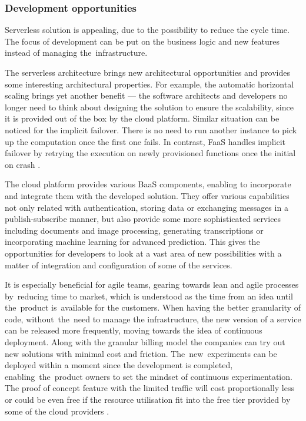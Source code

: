 \subsubsection{Development opportunities} \label{chapter:serverless-development-opportunities}

Serverless solution is appealing, due to the possibility to reduce the cycle time. The focus of development can be put on the business logic and new features instead of managing the~infrastructure.

The serverless architecture brings new architectural opportunities and provides some interesting architectural properties. For example, the automatic horizontal scaling brings yet another benefit --- the software architects and developers no longer need to think about designing the solution to ensure the scalability, since it is provided out of the box by the cloud platform. Similar situation can be noticed for the implicit failover. There is no need to run another instance to pick up the computation once the first one fails. In contrast, FaaS handles implicit failover by retrying the execution on newly provisioned functions once the initial on crash \cite{LeveragingServerlessCloudComputingArchitectures}.

The cloud platform provides various BaaS components, enabling to incorporate and integrate them with the developed solution. They offer various capabilities not only related with authentication, storing data or exchanging messages in a publish-subscribe manner, but also provide some more sophisticated services including documents and image processing, generating transcriptions or incorporating machine learning for advanced prediction. This gives the opportunities for developers to look at a vast area of new possibilities with a matter of integration and configuration of some of the services.

It is especially beneficial for agile teams, gearing towards lean and agile processes by~reducing time to market, which is understood as the time from an idea until the~product is~available for the customers. When having the better granularity of code, without~the~need to manage the infrastructure, the new version of a service can be released more frequently, moving towards the idea of continuous deployment. Along with the granular billing model the companies can try out new solutions with minimal cost and friction. The~new~experiments can be deployed within a moment since the development is completed, enabling~the~product owners to set the mindset of continuous experimentation. The proof of concept feature with the limited traffic will cost proportionally less or could be even free if the resource utilisation fit into the free tier provided by some of the cloud providers \cite{MartinFowlerServerless}.

